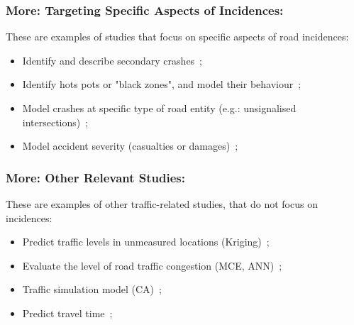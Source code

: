 \documentclass[hyperref={pdfpagelabels=true}]{beamer}
\begin{document}
\begin{frame}
\frametitle{More: Targeting Specific Aspects of Incidences:}
These are examples of studies that focus on specific aspects of road incidences:
\begin{itemize}
\item Identify and describe secondary crashes~\cite{secondary};%
\item Identify hots pots or "black zones", and model their behaviour~\cite{bayesian};
\item Model crashes at specific type of road entity (e.g.: unsignalised intersections)~\cite{mars};%
\item Model accident severity (casualties or damages)~\cite{severity};%
\end{itemize}
\end{frame}

\begin{frame}
\frametitle{More: Other Relevant Studies:}
These are examples of other traffic-related studies, that do not focus on incidences:
\begin{itemize}
\item Predict traffic levels in unmeasured locations (Kriging)~\cite{kriging};
\item Evaluate the level of road traffic congestion (MCE, ANN)~\cite{congestion};%
\item Traffic simulation model (CA)~\cite{ca};%
\item Predict travel time~\cite{traveltime};%
\end{itemize}
\end{frame}

\end{document}

